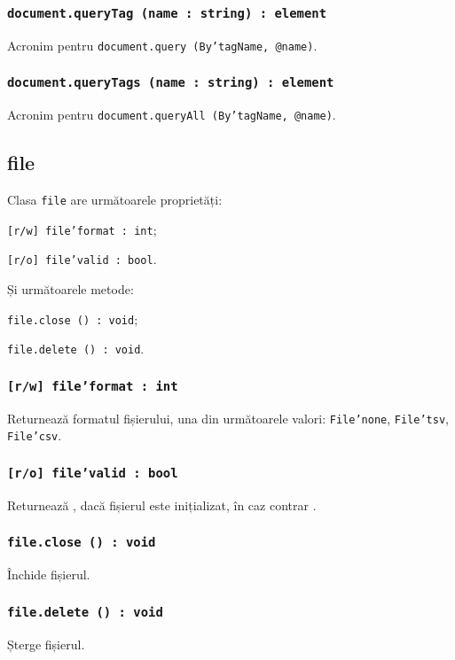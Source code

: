 \subsubsection{\texttt{document.queryTag (name : string) : element}}

Acronim pentru \texttt{document.query (By'tagName, @name)}.

\subsubsection{\texttt{document.queryTags (name : string) : element}}

Acronim pentru \texttt{document.queryAll (By'tagName, @name)}.


\subsection{file}

Clasa \texttt{file} are următoarele proprietăți:
\begin{icItems}
	\item \texttt{[r/w] file'format : int};
	\item \texttt{[r/o] file'valid : bool}.
\end{icItems}

Și următoarele metode:
\begin{icItems}
	\item \texttt{file.close () : void};
	\item \texttt{file.delete () : void}.
\end{icItems}

\subsubsection{\texttt{[r/w] file'format : int}}

Returnează formatul fișierului, una din următoarele valori: \texttt{File'none}, \texttt{File'tsv}, \texttt{File'csv}.

\subsubsection{\texttt{[r/o] file'valid : bool}}

Returnează \true, dacă fișierul este inițializat, în caz contrar \false.

\subsubsection{\texttt{file.close () : void}}

Închide fișierul.

\subsubsection{\texttt{file.delete () : void}}

Șterge fișierul.
